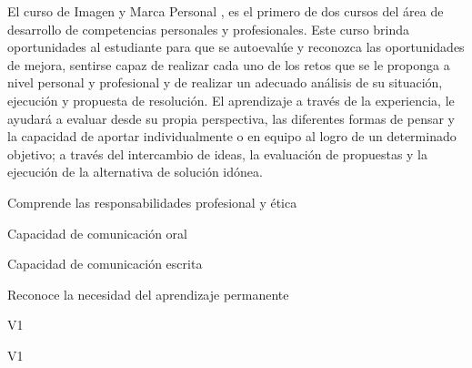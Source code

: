 \begin{syllabus}


\begin{justification}
El curso de Imagen y Marca Personal , es el primero de dos cursos del área de desarrollo de competencias personales y profesionales. Este curso brinda
oportunidades al estudiante para que se autoevalúe y reconozca las oportunidades de mejora, sentirse capaz de realizar cada uno de los retos que se le proponga a nivel
personal y profesional y de realizar un adecuado análisis de su situación, ejecución y propuesta de resolución.
El aprendizaje a través de la experiencia, le ayudará a evaluar desde su propia perspectiva, las diferentes formas de pensar y la capacidad de aportar individualmente o en equipo al logro de un determinado objetivo; a través del intercambio de ideas, la
evaluación de propuestas y la ejecución de la alternativa de solución idónea.

\end{justification}

\begin{goals}
\item Comprende las responsabilidades profesional y ética
\item Capacidad de comunicación oral
\item Capacidad de comunicación escrita
\item Reconoce la necesidad del aprendizaje permanente
\end{goals}

\begin{outcomes}{V1}
    \item {} %
    \item {} %
    \item {} %
    \item {} %
\end{outcomes}

\begin{competences}{V1}
    \item {}
    \item {}
    \item {}
    \item {}
\end{competences}


\end{syllabus}
